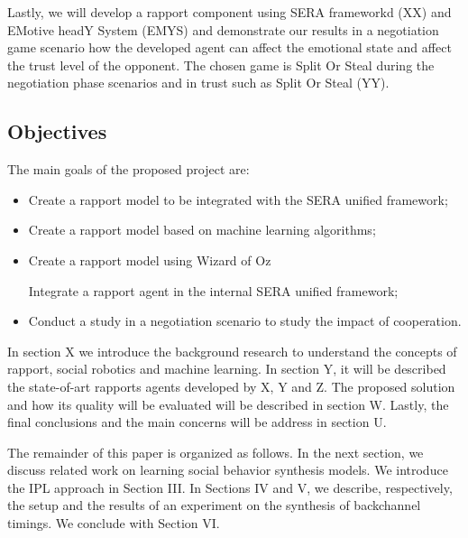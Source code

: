 Lastly, we will  develop a rapport component using SERA frameworkd (XX) and EMotive headY System (EMYS) and demonstrate our results in a negotiation game scenario how the developed agent can affect the emotional state and affect the trust level of the opponent. The chosen game is Split Or Steal during the negotiation phase scenarios and in trust such as Split Or Steal (YY).


%
%



\subsection{Objectives}
\label{subsec:Objectives}

The main goals of the proposed project are:
\begin{itemize}
	\item Create a rapport model to be integrated with the SERA unified framework;
	\item Create a rapport model based on machine learning algorithms;
	\item Create a rapport model using Wizard of Oz
	
	
	Integrate a rapport agent in the internal SERA unified framework;
	\item Conduct a study in a negotiation scenario to study the impact of cooperation.
\end{itemize}

In section X we introduce the background research to understand the concepts of rapport, social robotics and machine learning. In section Y, it will be described the state-of-art rapports agents developed by X, Y and Z. The proposed solution and how its quality will be evaluated will be described in section W. Lastly, the final conclusions and the main concerns will be address in section U.

The remainder of this paper is organized as follows. In
the next section, we discuss related work on learning social behavior synthesis models. We introduce the IPL approach in Section III. In Sections IV and V, we describe, respectively, the setup and the results of an experiment on the synthesis of backchannel timings. We conclude with Section VI.
